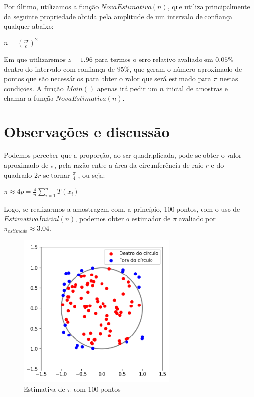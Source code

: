 \documentclass[a4paper]{article}
\begin{document}
Por último, utilizamos a função $NovaEstimativa(n)$, que utiliza principalmente da seguinte propriedade obtida pela amplitude de um intervalo de confiança qualquer abaixo:

\vspace{0.5cm}

\begin{center}

$n = (\frac{z\sigma}{\varepsilon})^2 $

\end{center}

\vspace{0.5cm}

Em que utilizaremos $z = 1.96$ para termos o  erro relativo avaliado em $0.05\%$ dentro do intervalo com confiança de $95\%$, que geram o número aproximado de pontos que são necessários para obter o valor que será estimado para $\pi$ nestas condições.
A função $Main()$ apenas irá pedir um $n$ inicial de amostras e chamar a função $NovaEstimativa(n)$.

\section{Observações e discussão}

Podemos perceber que a proporção, ao ser quadriplicada, pode-se obter o valor aproximado de $\pi$, pela razão entre a área da circunferência de raio $r$ e do quadrado $2r$ se tornar $\frac{\pi}{4}$ , ou seja:

\vspace{0.5cm}

\begin{center}

$\pi \approx
4p = \frac{4}{n}\sum_{i=1}^{n} T(x_i)$

\end{center}

\vspace{0.5cm}

Logo, se realizarmos a amostragem com, a princípio, 100 pontos, com o uso de $EstimativaInicial(n)$, podemos obter o estimador de $\pi$ avaliado por $\pi_{estimado} \approx 3.04$.

\begin{figure}[t]
  \centering
  \includegraphics[width=0.7\textwidth]{circulo.png}
  \caption{Estimativa de $\pi$ com 100 pontos}
  \label{fig:circulo}
\end{figure}
\end{document}
